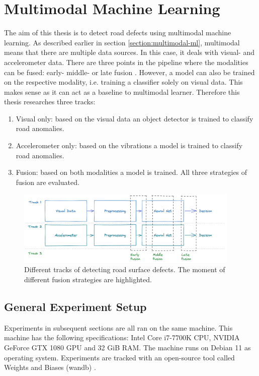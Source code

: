 \clearpage
\section{Multimodal Machine Learning}

The aim of this thesis is to detect road defects using multimodal machine learning. As described earlier in section \ref{section:multimodal-ml}, multimodal means that there are multiple data sources. In this case, it deals with visual- and accelerometer data. There are three points in the pipeline where the modalities can be fused: early- middle- or late fusion \cite{Baltrusaitis2017}. However, a model can also be trained on the respective modality, i.e. training a classifier solely on visual data. This makes sense as it can act as a baseline to multimodal learner. Therefore this thesis researches three tracks:
\begin{enumerate}
\item Visual only: based on the visual data an object detector is trained to classify road anomalies.
\item Accelerometer only: based on the vibrations a model is trained to classify road anomalies.
\item Fusion: based on both modalities a model is trained. All three strategies of fusion are evaluated.
\end{enumerate}


\begin{figure}[ht]
\begin{center}
\includegraphics[width=0.95\textwidth,keepaspectratio]{images/5_multimodal_fusion/fusion-strategies.png}
\captionsetup{width=.95\textwidth}
\caption{Different tracks of detecting road surface defects. The moment of different fusion strategies are highlighted.}
\label{fig:fusion-strategies}
\end{center}
\end{figure}


\subsection{General Experiment Setup}
Experiments in subsequent sections are all ran on the same machine. This machine has the following specifications: Intel Core i7-7700K CPU, NVIDIA GeForce GTX 1080 GPU and 32 GiB RAM. The machine runs on Debian 11 as operating system. Experiments are tracked with an open-source tool called Weights and Biases (wandb) \cite{wandb}.

